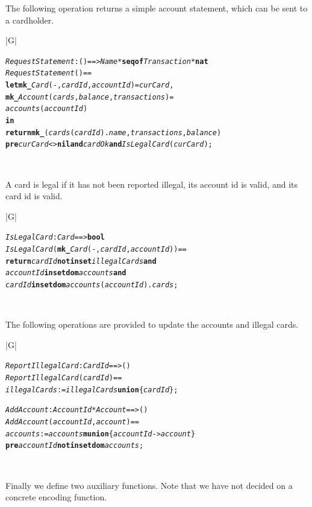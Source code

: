 \documentclass[\pformat,12pt,twoside]{article}
\newenvironment{VDMgray}%
{\begin{tabular}{|G|}\hline\small\begin{alltt}}%
{\end{alltt}\normalsize\\
 \hline\end{tabular}}
\begin{document}
The following operation returns a simple account statement, which 
can be sent to a cardholder.

\begin{VDMgray}
 \textit{RequestStatement} : () ==\texttt{>} \textit{Name} * \textbf{seq} \textbf{of} \textit{Transaction} * \textbf{nat}
 \textit{RequestStatement}() ==
   \textbf{let} \textbf{mk\_}\textit{Card}(-,\textit{cardId},\textit{accountId}) = \textit{curCard},
       \textbf{mk\_}\textit{Account}(\textit{cards},\textit{balance},\textit{transactions}) =
                  \textit{accounts}(\textit{accountId})
   \textbf{in}
     \textbf{return} \textbf{mk\_}(\textit{cards}(\textit{cardId}).\textit{name},\textit{transactions},\textit{balance})
 \textbf{pre} \textit{curCard} \texttt{<}\texttt{>} \textbf{nil} \textbf{and} \textit{cardOk} \textbf{and} \textit{IsLegalCard}(\textit{curCard});
\end{VDMgray}


A card is legal if it has not been reported illegal, its account 
id is valid, and its card id is valid.

\begin{VDMgray}
 \textit{IsLegalCard} : \textit{Card} ==\texttt{>} \textbf{bool}
 \textit{IsLegalCard}(\textbf{mk\_}\textit{Card}(-,\textit{cardId},\textit{accountId})) ==
   \textbf{return} \textit{cardId} \textbf{not in set} \textit{illegalCards} \textbf{and}
          \textit{accountId} \textbf{in set} \textbf{dom} \textit{accounts} \textbf{and}
          \textit{cardId} \textbf{in set} \textbf{dom} \textit{accounts}(\textit{accountId}).\textit{cards};
\end{VDMgray}


The following operations are provided to update the accounts 
and illegal cards. 

\begin{VDMgray}
 \textit{ReportIllegalCard} : \textit{CardId} ==\texttt{>} ()
 \textit{ReportIllegalCard}(\textit{cardId}) ==
   \textit{illegalCards} := \textit{illegalCards} \textbf{union} \{\textit{cardId}\};

 \textit{AddAccount} : \textit{AccountId} * \textit{Account} ==\texttt{>} ()
 \textit{AddAccount}(\textit{accountId},\textit{account}) ==
   \textit{accounts} := \textit{accounts} \textbf{munion} \{\textit{accountId} {\textbar}-\texttt{>} \textit{account}\}
 \textbf{pre} \textit{accountId} \textbf{not in set} \textbf{dom} \textit{accounts};
\end{VDMgray}


Finally we define two auxiliary functions. Note that we have 
not decided on a concrete encoding function.
\end{document}
